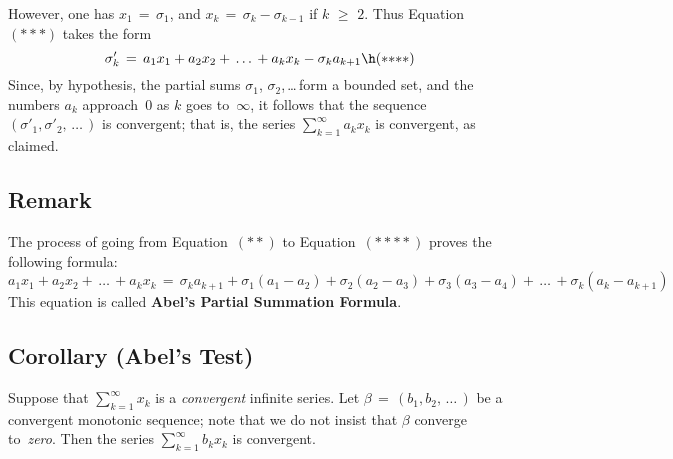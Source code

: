     However, one has $x_{1} \,=\, {\sigma}_{1}$, and $x_{k} \,=\, {\sigma}_{k} - {\sigma}_{k-1}$ if $k\,\,{\geq}\,\,2$.
    Thus Equation~$({\ast}{\ast}{\ast})$ takes the form
        \begin{displaymath}
        {\sigma}'_{k} \,=\, a_{1}x_{1} + a_{2}x_{2} + \,{\ldots}\, + a_{k}x_{k} - {\sigma}_{k}a_{k+1} \h ({\ast}{\ast}{\ast}{\ast})
        \end{displaymath}
    Since, by hypothesis, the partial sums ${\sigma}_{1}$, ${\sigma}_{2}$,\,{\ldots}\,form a bounded set,
    and the numbers $a_{k}$ approach~$0$ as $k$ goes to~${\infty}$, it follows that the sequence $({\sigma}'_{1},{\sigma}'_{2},\,{\ldots}\,)$ is convergent;
    that is, the series $\sum_{k=1}^{{\infty}} a_{k}x_{k}$ is convergent, as claimed.

\V

        \subsection{\small{{\bf Remark}}}
        \label{RemrkG40.95}

\V

        The process of going from Equation~$({\ast}{\ast})$ to Equation~$({\ast}{\ast}{\ast}{\ast})$ proves the following formula:
        \begin{equation}
        \label{EqnG.85}
a_{1}x_{1} + a_{2}x_{2} + \,{\ldots}\, + a_{k}x_{k} \,=\, 
{\sigma}_{k}a_{k+1} + {\sigma}_{1}(a_{1} - a_{2}) + {\sigma}_{2}(a_{2} - a_{3}) + {\sigma}_{3}(a_{3} -a_{4}) + \,{\ldots}\, + {\sigma}_{k}(a_{k}-a_{k+1})
        \end{equation}
    This equation is called {\bf Abel's Partial Summation Formula}.

\V
\V

        \subsection{\small{{\bf Corollary}} (Abel's Test)}
        \label{ThmG40.100}

\V

        Suppose that $\sum_{k=1}^{{\infty}} x_{k}$ is a {\em convergent} infinite series.
    Let ${\beta} \,=\, (b_{1},b_{2},\,{\ldots}\,)$ be a convergent monotonic sequence;
    note that we do not insist that ${\beta}$ converge to~{\em zero}.
    Then the series $\sum_{k=1}^{{\infty}} b_{k}x_{k}$ is convergent.

\V

